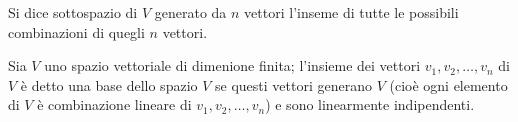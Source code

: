 \begin{definition}
Si dice sottospazio di $V$ generato da $n$ vettori l'inseme di tutte le possibili combinazioni di quegli $n$ vettori.
\end{definition}


\begin{definition}[Base]
Sia $V$ uno spazio vettoriale di dimenione finita; l'insieme dei vettori  $v_1, v_2, \ldots, v_n$ di $V$ è detto una base dello spazio $V$ se questi vettori generano $V$ (cioè ogni elemento di $V$ è combinazione lineare di $v_1, v_2, \ldots, v_n$) e sono linearmente indipendenti.
\end{definition}
